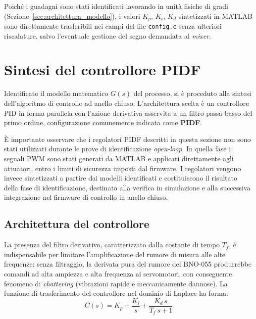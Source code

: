 \documentclass[11pt]{report}
\begin{document}
Poiché i guadagni sono stati identificati lavorando in unità fisiche di gradi (Sezione~\ref{sec:architettura_modello}), i valori $K_p$, $K_i$, $K_d$ sintetizzati in MATLAB sono direttamente trasferibili nei campi del file \texttt{config.c} senza ulteriori riscalature, salvo l'eventuale gestione del segno demandata al \textit{mixer}.

\section{Sintesi del controllore PIDF}
\label{sec:sintesi_pidf}

Identificato il modello matematico $G(s)$ del processo, si è proceduto alla sintesi dell'algoritmo di controllo ad anello chiuso. L'architettura scelta è un controllore PID in forma parallela con l'azione derivativa asservita a un filtro passa-basso del primo ordine, configurazione comunemente indicata come \textbf{PIDF}.

È importante osservare che i regolatori PIDF descritti in questa sezione non sono stati utilizzati durante le prove di identificazione \textit{open-loop}. In quella fase i segnali PWM sono stati generati da MATLAB e applicati direttamente agli attuatori, entro i limiti di sicurezza imposti dal firmware. I regolatori vengono invece sintetizzati a partire dai modelli identificati e costituiscono il risultato della fase di identificazione, destinato alla verifica in simulazione e alla successiva integrazione nel firmware di controllo in anello chiuso.

\subsection{Architettura del controllore}

La presenza del filtro derivativo, caratterizzato dalla costante di tempo $T_f$, è indispensabile per limitare l'amplificazione del rumore di misura alle alte frequenze: senza filtraggio, la derivata pura del rumore del BNO-055 produrrebbe comandi ad alta ampiezza e alta frequenza ai servomotori, con conseguente fenomeno di \textit{chattering} (vibrazioni rapide e meccanicamente dannose). La funzione di trasferimento del controllore nel dominio di Laplace ha forma:
\begin{equation}
	C(s) = K_p + \frac{K_i}{s} + \frac{K_d \, s}{T_f \, s + 1}
	\label{eq:pidf}
\end{equation}
\end{document}
